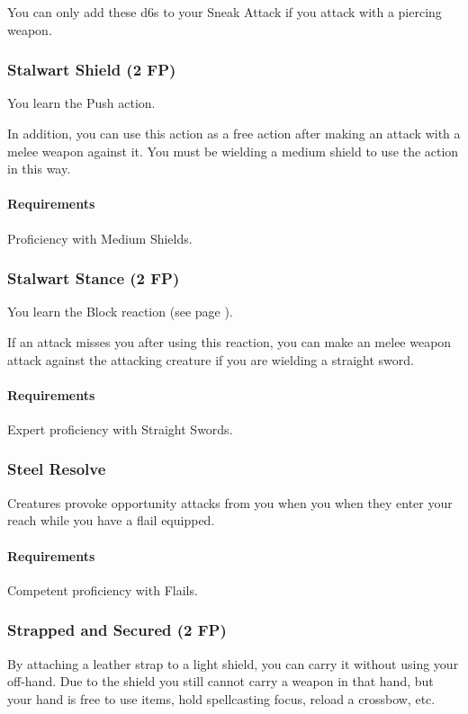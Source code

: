     You can only add these d6s to your Sneak Attack if you attack with a piercing weapon.
\subsubsection{Stalwart Shield (2 FP)} \label{feat::stalwartshield}
    You learn the Push action.

    In addition, you can use this action as a free action after making an attack with a melee weapon against it.
    You must be wielding a medium shield to use the action in this way.
    \paragraph{Requirements} Proficiency with Medium Shields.
\subsubsection{Stalwart Stance (2 FP)} \label{feat::stalwartstance}
    You learn the Block reaction (see page \pageref{act::block}).

    If an attack misses you after using this reaction, you can make an melee weapon attack against the attacking creature if you are wielding a straight sword.
    \paragraph{Requirements} Expert proficiency with Straight Swords.
\subsubsection{Steel Resolve} \label{feat::steelresolve}
    Creatures provoke opportunity attacks from you when you when they enter your reach while you have a flail equipped.
    \paragraph{Requirements} Competent proficiency with Flails.
\subsubsection{Strapped and Secured (2 FP)} \label{feat::strappedandsecured}
    By attaching a leather strap to a light shield, you can carry it without using your off-hand.
    Due to the shield you still cannot carry a weapon in that hand, but your hand is free to use items, hold spellcasting focus, reload a crossbow, etc.

